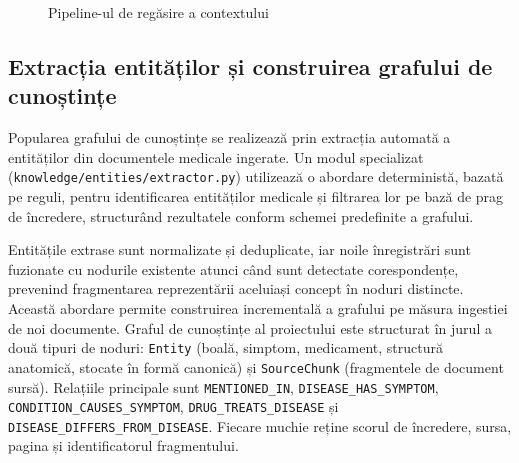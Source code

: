 \documentclass[12pt, a4paper, oneside, romanian]{teza-upb}
\begin{document}
\begin{figure}[H]
\centering
{}
\caption{Pipeline-ul de regăsire a contextului}
\label{fig:rag-retrieval}
\end{figure}


\subsection{Extracția entităților și construirea grafului de cunoștințe}

Popularea grafului de cunoștințe se realizează prin extracția automată a entităților din documentele medicale ingerate. Un modul specializat (\texttt{knowledge/entities/extractor.py}) utilizează o abordare deterministă, bazată pe reguli, pentru identificarea entităților medicale și filtrarea lor pe bază de prag de încredere, structurând rezultatele conform schemei predefinite a grafului.

Entitățile extrase sunt normalizate și deduplicate, iar noile înregistrări sunt fuzionate cu nodurile existente atunci când sunt detectate corespondențe, prevenind fragmentarea reprezentării aceluiași concept în noduri distincte. Această abordare permite construirea incrementală a grafului pe măsura ingestiei de noi documente.
Graful de cunoștințe al proiectului este structurat în jurul a două tipuri de noduri: \texttt{Entity} (boală, simptom, medicament, structură anatomică, stocate în formă canonică) și \texttt{SourceChunk} (fragmentele de document sursă). Relațiile principale sunt \texttt{MENTIONED\_IN}, \texttt{DISEASE\_HAS\_SYMPTOM}, \texttt{CONDITION\_CAUSES\_SYMPTOM}, \texttt{DRUG\_TREATS\_DISEASE} și \texttt{DISEASE\_DIFFERS\_FROM\_DISEASE}. Fiecare muchie reține scorul de încredere, sursa, pagina și identificatorul fragmentului.
\end{document}
